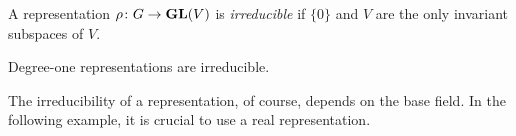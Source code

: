 
\begin{definition}
    A representation $\rho\colon G\to\mathbf{GL}(V)$ is \emph{irreducible} if
    $\{0\}$ and $V$ are the only invariant subspaces of $V$.
\end{definition}

Degree-one representations are irreducible. 

The irreducibility 
of a representation, of course, depends on the base field. 
In the following example, it is crucial to use a real representation.

